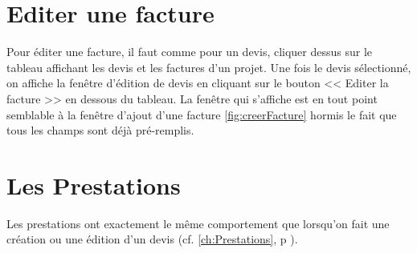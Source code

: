 \section{Editer une facture}
Pour éditer une facture, il faut comme pour un devis, cliquer dessus sur le tableau affichant les devis et les factures d'un projet. Une fois le devis sélectionné, on affiche la fenêtre d'édition de devis en cliquant sur le bouton << Editer la facture >> en dessous du tableau.
La fenêtre qui s'affiche est en tout point semblable à la fenêtre d'ajout d'une facture \ref{fig:creerFacture} hormis le fait que tous les champs sont déjà pré-remplis.
\section{Les Prestations}
Les prestations ont exactement le même comportement que lorsqu'on fait une création ou une édition d'un devis (cf. \ref{ch:Prestations}, p \pageref{ch:Prestations}).